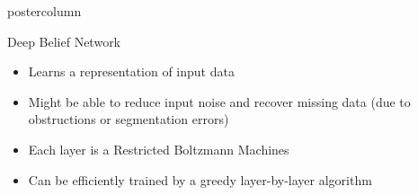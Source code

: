 \documentclass[final]{beamer}
\begin{document}
\begin{frame}
\begin{columns}
\begin{column}{.33\textwidth}
\begin{beamercolorbox}[center,wd=\textwidth]{postercolumn}
\begin{minipage}[T]{.95\textwidth}
{\begin{block}{Deep Belief Network}
\begin{figure}[htbp]
                   \label{fig:}
                \end{figure}
              \begin{itemize}
                  \item Learns a representation of input data
                  \item Might be able to reduce input noise and recover missing
                  data (due to obstructions or segmentation errors)
                  \item Each layer is a Restricted Boltzmann Machines
                  \item Can be efficiently trained by a greedy layer-by-layer
                  algorithm
              \end{itemize}              
            \end{block}
}
\end{minipage}
\end{beamercolorbox}
\end{column}
\end{columns}
\end{frame}
\end{document}
